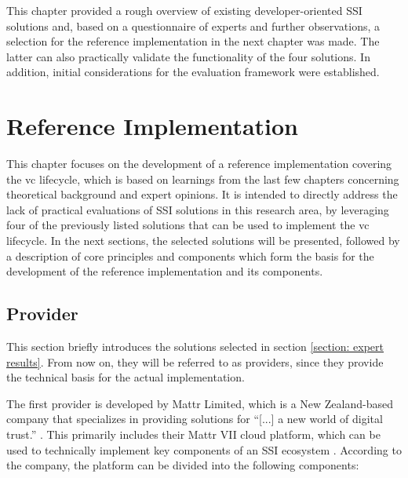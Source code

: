    This chapter provided a rough overview of existing developer-oriented \ac{SSI} solutions and, based on a questionnaire of experts and further observations, a selection for the reference implementation in the next chapter was made. The latter can also practically validate the functionality of the four solutions. In addition, initial considerations for the evaluation framework were established.

\chapter{Reference Implementation}\label{chapter: ref implementation}

This chapter focuses on the development of a reference implementation covering the \ac{vc} lifecycle, which is based on learnings from the last few chapters concerning theoretical background and expert opinions. It is intended to directly address the lack of practical evaluations of \ac{SSI} solutions in this research area, by leveraging four of the previously listed solutions that can be used to implement the \ac{vc} lifecycle. In the next sections, the selected solutions will be presented, followed by a description of core principles and components which form the basis for the development of the reference implementation and its components.

    \section{Provider}
    
    This section briefly introduces the solutions selected in section \ref{section: expert results}. From now on, they will be referred to as providers, since they provide the technical basis for the actual implementation.
    
    The first provider is developed by Mattr Limited, which is a New Zealand-based company \cite{Mattr_privacy_2021} that specializes in providing solutions for “[...] a new world of digital trust.” \cite{Mattr_Mattr_2021-4}. This primarily includes their Mattr VII cloud platform, which can be used to technically implement key components of an \ac{SSI} ecosystem \cite{Mattr_products_2021}. According to the company, the platform can be divided into the following components: \cite{Mattr_Mattr_2021-2}

